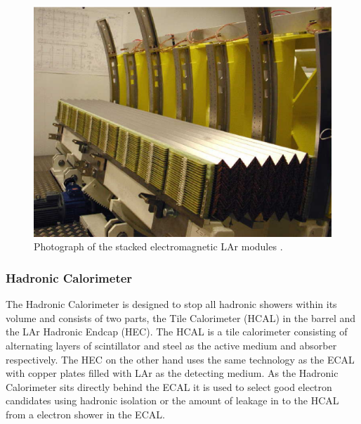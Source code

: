 		\begin{figure}[h]
			\begin{center}
				\includegraphics[scale=0.7]{images/LARG3-fig02-module00.eps}
			\end{center}
			\caption{Photograph of the stacked electromagnetic LAr modules \cite{Aad:1129811}.}
			\label{fig:ATLAS_calo_crack}
		\end{figure}


		\subsubsection*{Hadronic Calorimeter}

		The Hadronic Calorimeter is designed to stop all hadronic showers within its volume and consists of two parts, the Tile Calorimeter (HCAL) in the barrel and the LAr Hadronic Endcap (HEC). The HCAL is a tile calorimeter consisting of alternating layers of scintillator and steel as the active medium and absorber respectively. The HEC on the other hand uses the same technology as the ECAL with copper plates filled with LAr as the detecting medium. As the Hadronic Calorimeter sits directly behind the ECAL it is used to select good electron candidates using hadronic isolation or the amount of leakage in to the HCAL from a electron shower in the ECAL.\\
		



